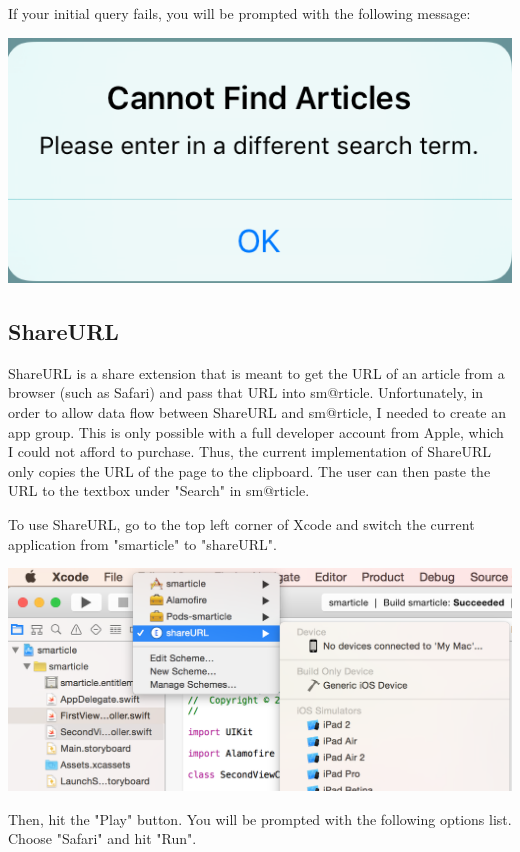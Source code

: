 \documentclass[11pt, margin=1in]{article}
\begin{document}
If your initial query fails, you will be prompted with the following message:
\begin{center}
\includegraphics[scale=0.7]{7.jpg}
\end{center}

\subsection{ShareURL}
ShareURL is a share extension that is meant to get the URL of an article from a browser (such as Safari) and pass that URL into sm@rticle.  Unfortunately, in order to allow data flow between ShareURL and sm@rticle, I needed to create an app group.  This is only possible with a full developer account from Apple, which I could not afford to purchase.  Thus, the current implementation of ShareURL only copies the URL of the page to the clipboard.  The user can then paste the URL to the textbox under "Search" in sm@rticle.  

To use ShareURL, go to the top left corner of Xcode and switch the current application from "smarticle" to "shareURL". 

\begin{center}
\includegraphics[scale=0.5]{8.jpg}
\end{center}   

Then, hit the "Play" button.  You will be prompted with the following options list.  Choose "Safari" and hit "Run".  
\end{document}
